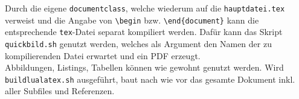 Durch die eigene \texttt{documentclass}, welche wiederum auf die \texttt{hauptdatei.tex} verweist und 
die Angabe von \texttt{\textbackslash begin} bzw. \texttt{\textbackslash end\{document\}} kann die entsprechende 
\texttt{tex}-Datei separat kompiliert werden. Dafür kann das Skript \texttt{quickbild.sh} genutzt werden, welches 
als Argument den Namen der zu kompilierenden Datei erwartet und ein PDF erzeugt.\\
Abbildungen, Listings, Tabellen können wie gewohnt genutzt werden. Wird \texttt{buildlualatex.sh} ausgeführt, 
baut nach wie vor das gesamte Dokument inkl. aller Subfiles und Referenzen. 
